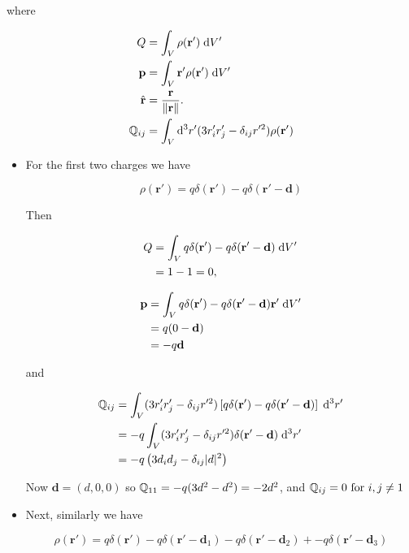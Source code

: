 \documentclass[a4paper]{article}
\begin{document}
where 

\begin{align*}
Q &= \int_V \rho(\mathbf{r}')\;\mathrm{d} V' \\
\mathbf{p} &= \int_V \mathbf{r}'\rho(\mathbf{r}')\; \mathrm{d} V'\\
\hat{\mathbf{r}} &= \frac{\mathbf{r}}{\|\mathbf{r}\|}.\\
\mathbb{Q}_{ij} & = \int_{V} \mathrm{d}^{3} r' ( 3 r_{i}' r_{j}' - \delta_{ij} r'^{2} ) \rho(\mathbf{r}') 
\end{align*}

\begin{itemize}
	\item For the first two charges we have
	
	\[ \rho(\mathbf{r}') = q \delta(\mathbf{r'}) - q \delta(\mathbf{r'} - \mathbf{d})  \]
	
	Then
	
	\begin{align*}
	Q &= \int_V q \delta(\mathbf{r'}) - q \delta(\mathbf{r'} - \mathbf{d}) \;\mathrm{d} V' \\
	& = 1 - 1 = 0,
	\end{align*}
	
	\begin{align*}
	\mathbf{p} & = \int_{V} q \delta(\mathbf{r'}) - q \delta(\mathbf{r'} - \mathbf{d}) \mathbf{r}'  \; \mathrm{d} V' \\
	& = q(0 - \mathbf{d}) \\
	& = -q\mathbf{d}
	\end{align*}
	
	and 
	
	\begin{align*}
	\mathbb{Q}_{ij} & = \int_{V} ( 3 r'_{i} r'_{j} - \delta_{ij} r'^{2} ) \left[  q \delta(\mathbf{r'}) - q \delta(\mathbf{r'} - \mathbf{d}) \right] \;  \mathrm{d}^{3} r' \\
	& = - q \int_{V} ( 3 r'_{i} r'_{j} - \delta_{ij} r'^{2} ) \delta(\mathbf{r'} - \mathbf{d}) \;  \mathrm{d}^{3} r' \\
	& = - q \left(  3 d_{i} d_{j} - \delta_{ij} | d |^{2}  \right)  \\
	\end{align*}
	
	Now $ \mathbf{d} = (d,0,0) $ so $ \mathbb{Q}_{11} = -q(3d^{2} - d^{2}) = - 2d^{2}  $, and $ \mathbb{Q}_{ij} = 0 \text{ for } i,j \neq 1 $
	
	\item Next, similarly we have 
	
	
	\[ \rho(\mathbf{r}') = q \delta(\mathbf{r'}) - q \delta(\mathbf{r'} - \mathbf{d}_{1}) - q \delta(\mathbf{r'} - \mathbf{d}_{2}) + - q \delta(\mathbf{r'} - \mathbf{d}_{3})   \]
	

\end{itemize}
\end{document}
